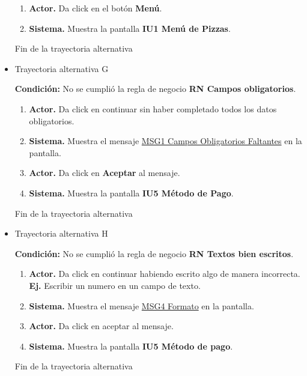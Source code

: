 \begin{itemize}
	\begin{enumerate}
		\item \textbf{Actor.} Da click en el botón \textbf{Menú}.
		\item \textbf{Sistema.} Muestra la pantalla \textbf{IU1 Menú de Pizzas}.
	\end{enumerate}
	
	Fin de la trayectoria alternativa
	
	\item \hypertarget{TAG:CU4}{Trayectoria alternativa G}
	
		\noindent \textbf{Condición:} No se cumplió la regla de negocio \textbf{RN Campos obligatorios}.
	
	\begin{enumerate}
		\item \textbf{Actor.} Da click en continuar sin haber completado todos los datos obligatorios.
		\item \textbf{Sistema.} Muestra el mensaje \hyperlink{MSG1:CamposObligatorios}{MSG1 Campos Obligatorios Faltantes} en la pantalla.
		\item \textbf{Actor.} Da click en \textbf{Aceptar} al mensaje.
		\item \textbf{Sistema.} Muestra la pantalla \textbf{IU5 Método de Pago}.
	\end{enumerate}
	
	Fin de la trayectoria alternativa
	
		\item \hypertarget{TAH:CU4}{Trayectoria alternativa H}
	
	\noindent \textbf{Condición:} No se cumplió la regla de negocio \textbf{RN Textos bien escritos}.
	
	\begin{enumerate}
		\item \textbf{Actor.} Da click en continuar habiendo escrito algo de manera incorrecta.
		\\\textbf{Ej.} Escribir un numero en un campo de texto.
		\item \textbf{Sistema.} Muestra el mensaje \hyperlink{MSG4:Formato}{MSG4 Formato} en la pantalla.
		\item \textbf{Actor.} Da click en aceptar al mensaje.
		\item \textbf{Sistema.} Muestra la pantalla \textbf{IU5 Método de pago}.
	\end{enumerate}
	
	Fin de la trayectoria alternativa
	
\end{itemize}


